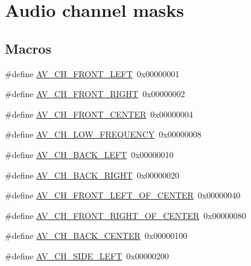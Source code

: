 \hypertarget{group__channel__masks}{}\section{Audio channel masks}
\label{group__channel__masks}
\subsection*{Macros}
\begin{DoxyCompactItemize}
\item 
\#define \hyperlink{group__channel__masks_gaf9c5619f74c99ea8a8606719c01fe7df}{A\+V\+\_\+\+C\+H\+\_\+\+F\+R\+O\+N\+T\+\_\+\+L\+E\+FT}~0x00000001
\item 
\#define \hyperlink{group__channel__masks_ga394b4b2c87790178bf7b683b45320f31}{A\+V\+\_\+\+C\+H\+\_\+\+F\+R\+O\+N\+T\+\_\+\+R\+I\+G\+HT}~0x00000002
\item 
\#define \hyperlink{group__channel__masks_ga88f2868b232a89fd11ad9d6c39d502a1}{A\+V\+\_\+\+C\+H\+\_\+\+F\+R\+O\+N\+T\+\_\+\+C\+E\+N\+T\+ER}~0x00000004
\item 
\#define \hyperlink{group__channel__masks_gab19b66e345cf1f9d50ffc26c28862bcc}{A\+V\+\_\+\+C\+H\+\_\+\+L\+O\+W\+\_\+\+F\+R\+E\+Q\+U\+E\+N\+CY}~0x00000008
\item 
\#define \hyperlink{group__channel__masks_gaa3cae8c6d0eaab3dc3ce178f6af81ae2}{A\+V\+\_\+\+C\+H\+\_\+\+B\+A\+C\+K\+\_\+\+L\+E\+FT}~0x00000010
\item 
\#define \hyperlink{group__channel__masks_ga7a7ab3bb418bf9672dcdf6554346e5eb}{A\+V\+\_\+\+C\+H\+\_\+\+B\+A\+C\+K\+\_\+\+R\+I\+G\+HT}~0x00000020
\item 
\#define \hyperlink{group__channel__masks_ga6c9ea2ea60044bfe844174300b237386}{A\+V\+\_\+\+C\+H\+\_\+\+F\+R\+O\+N\+T\+\_\+\+L\+E\+F\+T\+\_\+\+O\+F\+\_\+\+C\+E\+N\+T\+ER}~0x00000040
\item 
\#define \hyperlink{group__channel__masks_ga558dc25b0ce327d2547d3cc9e4bd6a4e}{A\+V\+\_\+\+C\+H\+\_\+\+F\+R\+O\+N\+T\+\_\+\+R\+I\+G\+H\+T\+\_\+\+O\+F\+\_\+\+C\+E\+N\+T\+ER}~0x00000080
\item 
\#define \hyperlink{group__channel__masks_ga68650a364e52edb62d5984dddec4f935}{A\+V\+\_\+\+C\+H\+\_\+\+B\+A\+C\+K\+\_\+\+C\+E\+N\+T\+ER}~0x00000100
\item 
\#define \hyperlink{group__channel__masks_ga02e55f35249dfa57a2e4edfd3acfec4f}{A\+V\+\_\+\+C\+H\+\_\+\+S\+I\+D\+E\+\_\+\+L\+E\+FT}~0x00000200
\item 

\end{DoxyCompactItemize}
